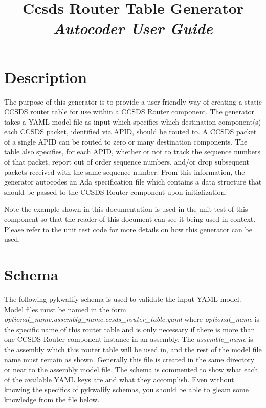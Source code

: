 



\title{\textbf{Ccsds Router Table Generator} \\
\large\textit{Autocoder User Guide}}
\date{}
\maketitle

\section{Description}

The purpose of this generator is to provide a user friendly way of creating a static CCSDS router table for use within a CCSDS Router component. The generator takes a YAML model file as input which specifies which destination component(s) each CCSDS packet, identified via APID, should be routed to. A CCSDS packet of a single APID can be routed to zero or many destination components. The table also specifies, for each APID, whether or not to track the sequence numbers of that packet, report out of order sequence numbers, and/or drop subsequent packets received with the same sequence number. From this information, the generator autocodes an Ada specification file which contains a data structure that should be passed to the CCSDS Router component upon initialization.

Note the example shown in this documentation is used in the unit test of this component so that the reader of this document can see it being used in context. Please refer to the unit test code for more details on how this generator can be used.

\section{Schema}

The following pykwalify schema is used to validate the input YAML model. Model files must be named in the form \textit{optional\_name.assembly\_name.ccsds\_router\_table.yaml} where \textit{optional\_name} is the specific name of this router table and is only necessary if there is more than one CCSDS Router component instance in an assembly. The \textit{assemble\_name} is the assembly which this router table will be used in, and the rest of the model file name must remain as shown. Generally this file is created in the same directory or near to the assembly model file. The schema is commented to show what each of the available YAML keys are and what they accomplish. Even without knowing the specifics of pykwalify schemas, you should be able to gleam some knowledge from the file below.

